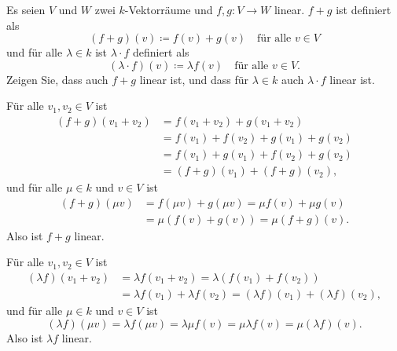 \begin{question}
 Es seien $V$ und $W$ zwei $k$-Vektorräume und $f, g \colon V \to W$ linear. $f + g$ ist definiert als
 \[
  (f + g)(v) \coloneqq f(v) + g(v) \quad \text{für alle $v \in V$}
 \]
 und für alle $\lambda \in k$ ist $\lambda \cdot f$ definiert als
 \[
  (\lambda \cdot f)(v) \coloneqq \lambda f(v) \quad \text{für alle $v \in V$}.
 \]
 Zeigen Sie, dass auch $f + g$ linear ist, und dass für $\lambda \in k$ auch $\lambda \cdot f$ linear ist.
\end{question}
\begin{solution}
 Für alle $v_1, v_2 \in V$ ist
 \begin{align*}
  (f + g)(v_1 + v_2)
  &= f(v_1 + v_2) + g(v_1 + v_2) \\
  &= f(v_1) + f(v_2) + g(v_1) + g(v_2) \\
  &= f(v_1) + g(v_1) + f(v_2) + g(v_2) \\
  &= (f + g)(v_1) + (f + g)(v_2),
 \end{align*}
 und für alle $\mu \in k$ und $v \in V$ ist
 \begin{align*}
  (f + g)(\mu v)
  &= f(\mu v) + g(\mu v)
  = \mu f(v) + \mu g(v) \\
  &= \mu (f(v) + g(v))
  = \mu (f + g)(v).
 \end{align*}
 Also ist $f + g$ linear.
 
 Für alle $v_1, v_2 \in V$ ist
 \begin{align*}
  (\lambda f)(v_1 + v_2)
  &= \lambda f(v_1 + v_2)
  = \lambda (f(v_1) + f(v_2)) \\
  &= \lambda f(v_1) + \lambda f(v_2)
  = (\lambda f)(v_1) + (\lambda f)(v_2),
 \end{align*}
 und für alle $\mu \in k$ und $v \in V$ ist
 \[
  (\lambda f)(\mu v)
  = \lambda f(\mu v)
  = \lambda \mu f(v)
  = \mu \lambda f(v)
  = \mu (\lambda f)(v).
 \]
 Also ist $\lambda f$ linear.
\end{solution}


